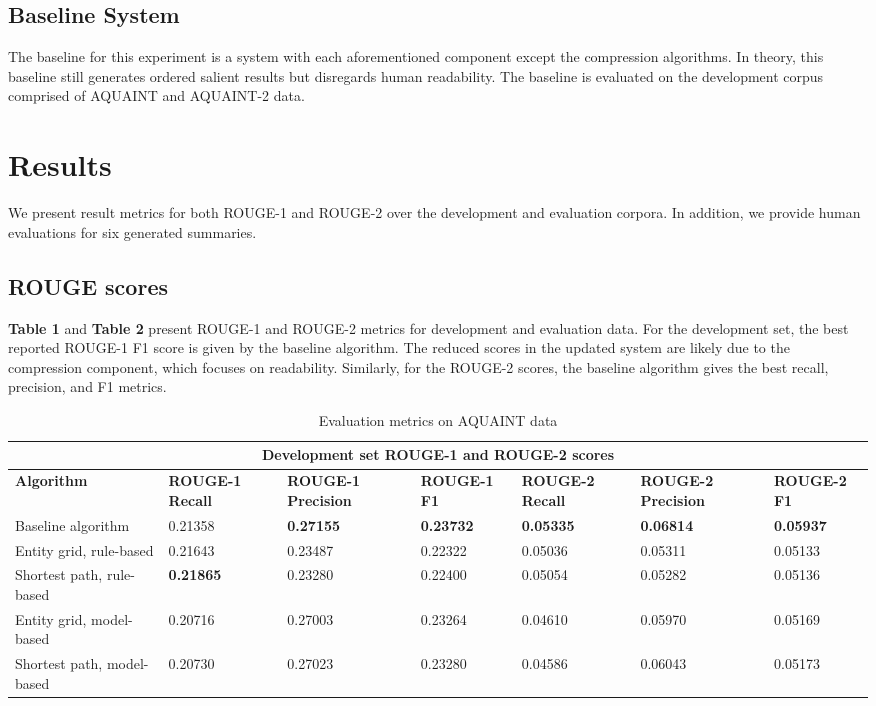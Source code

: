 \documentclass[11pt]{article}
\begin{document}
\subsection{Baseline System}
The baseline for this experiment is a system with each aforementioned component except the compression algorithms. In theory, this baseline still generates ordered salient results but disregards human readability. The baseline is evaluated on the development corpus comprised of AQUAINT and AQUAINT-2 data.

\section{Results}
We present result metrics for both ROUGE-1 and ROUGE-2 over the development and evaluation corpora. In addition, we provide human evaluations for six generated summaries. 

\subsection{ROUGE scores}
\textbf{Table 1} and \textbf{Table 2} present ROUGE-1 and ROUGE-2 metrics for development and evaluation data. For the development set, the best reported  ROUGE-1 F1 score is given by the baseline algorithm. The reduced scores in the updated system are likely due to the compression component, which focuses on readability. Similarly, for the ROUGE-2 scores, the baseline algorithm gives the best recall, precision, and F1 metrics.

\begin{table*}[h]
\begin{tabular}{|p{4.3cm}||p{1.735cm}|p{1.78cm}|p{1.735cm}|p{1.735cm}|p{1.78cm}|p{1.735cm}| }
 \hline
 \multicolumn{7}{|c|}{Development set ROUGE-1 and ROUGE-2 scores} \\
 \hline
 \textbf{Algorithm} & \textbf{ROUGE-1 Recall} & \textbf{ROUGE-1 Precision} & \textbf{ROUGE-1 F1} & \textbf{ROUGE-2 Recall} & \textbf{ROUGE-2 Precision} & \textbf{ROUGE-2 F1}\\
 \hline
Baseline algorithm & 0.21358 & \textbf{0.27155} & \textbf{0.23732} & \textbf{0.05335} & \textbf{0.06814} & \textbf{0.05937} \\ 
Entity grid, rule-based & 0.21643 & 0.23487 & 0.22322 & 0.05036 & 0.05311 & 0.05133 \\
Shortest path, rule-based & \textbf{0.21865} & 0.23280 & 0.22400 & 0.05054 & 0.05282 & 0.05136 \\
Entity grid, model-based & 0.20716 & 0.27003 & 0.23264 & 0.04610 & 0.05970 & 0.05169 \\
Shortest path, model-based & 0.20730 & 0.27023 & 0.23280 & 0.04586 & 0.06043 & 0.05173 \\
\hline
\end{tabular}
\caption{Evaluation metrics on AQUAINT data}
\label{tab:dev} 
\end{table*}
\end{document}
